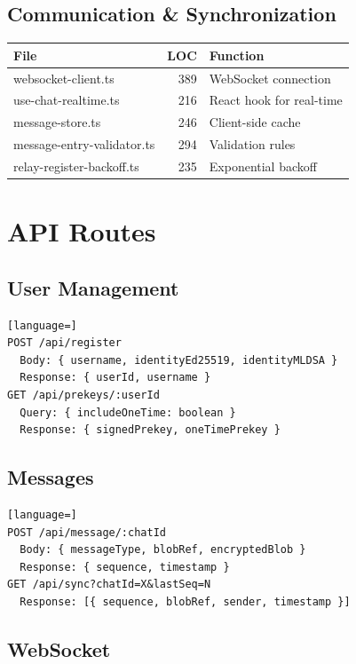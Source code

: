\documentclass[11pt,a4paper,oneside]{book}
\begin{document}
\vspace{-0.2cm}\subsection{Communication \& Synchronization}
\begin{table}[h]
\centering
\begin{tabular}{|l|r|l|}
\hline
\textbf{File} & \textbf{LOC} & \textbf{Function} \\
\hline
websocket-client.ts & 389 & WebSocket connection \\
\hline
use-chat-realtime.ts & 216 & React hook for real-time \\
\hline
message-store.ts & 246 & Client-side cache \\
\hline
message-entry-validator.ts & 294 & Validation rules \\
\hline
relay-register-backoff.ts & 235 & Exponential backoff \\
\hline
\end{tabular}
\end{table}
\vspace{-0.3cm}\section{API Routes}
\vspace{-0.2cm}\subsection{User Management}
\begin{lstlisting}[language=]
POST /api/register
  Body: { username, identityEd25519, identityMLDSA }
  Response: { userId, username }
GET /api/prekeys/:userId
  Query: { includeOneTime: boolean }
  Response: { signedPrekey, oneTimePrekey }
\end{lstlisting}
\vspace{-0.2cm}\subsection{Messages}
\begin{lstlisting}[language=]
POST /api/message/:chatId
  Body: { messageType, blobRef, encryptedBlob }
  Response: { sequence, timestamp }
GET /api/sync?chatId=X&lastSeq=N
  Response: [{ sequence, blobRef, sender, timestamp }]
\end{lstlisting}
\vspace{-0.2cm}\subsection{WebSocket}
\end{document}
